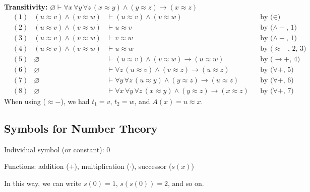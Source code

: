 \documentclass[11pt]{article}
\theoremstyle{definition}
\begin{document}
{\bf Transitivity:} $\varnothing \vdash \forall x \, \forall y \, \forall z \, (x \approx y) \wedge (y \approx z) \to (x \approx z)$
\begin{align*}
    &(1) & (u \approx v) \wedge (v \approx w) &\vdash (u \approx v) \wedge (v \approx w) & & \text{by ($\in$)} \\
    &(2) & (u \approx v) \wedge (v \approx w) &\vdash u \approx v & & \text{by ($\wedge-$, 1)} \\
    &(3) & (u \approx v) \wedge (v \approx w) &\vdash v \approx w & & \text{by ($\wedge-$, 1)} \\
    &(4) & (u \approx v) \wedge (v \approx w) &\vdash u \approx w & & \text{by ($\approx-$, 2, 3)} \\
    &(5) & \varnothing &\vdash (u \approx v) \wedge (v \approx w) \to (u \approx w) & & \text{by ($\rightarrow+$, 4)} \\
    &(6) & \varnothing &\vdash \forall z \, (u \approx v) \wedge (v \approx z) \to (u \approx z) & & \text{by ($\forall+$, 5)} \\
    &(7) & \varnothing &\vdash \forall y \, \forall z \, (u \approx y) \wedge (y \approx z) \to (u \approx z) & & \text{by ($\forall+$, 6)} \\
    &(8) & \varnothing &\vdash \forall x \, \forall y \, \forall z \, (x \approx y) \wedge (y \approx z) \to (x \approx z) & & \text{by ($\forall+$, 7)}
\end{align*}
When using ($\approx-$), we had $t_1 = v$, $t_2 = w$, and $A(x) = u \approx x$.

\subsection{Symbols for Number Theory}
Individual symbol (or constant): 0 

Functions: addition ($+$), multiplication ($\cdot$), successor ($s(x)$)

In this way, we can write $s(0) = 1$, $s(s(0)) = 2$, and so on.
\end{document}
